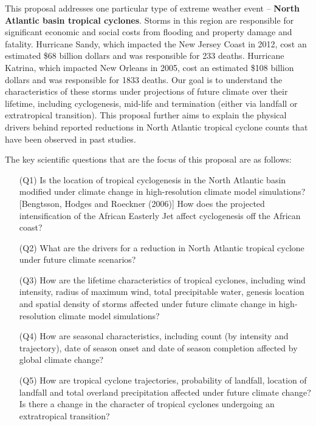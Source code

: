 \documentclass[11pt]{article}
\begin{document}
This proposal addresses one particular type of extreme weather event -- \textbf{North Atlantic basin tropical cyclones}.  Storms in this region are responsible for significant economic and social costs from flooding and property damage and fatality.  Hurricane Sandy, which impacted the New Jersey Coast in 2012, cost an estimated \$68 billion dollars and was responsible for 233 deaths.  Hurricane Katrina, which impacted New Orleans in 2005, cost an estimated \$108 billion dollars and was responsible for 1833 deaths.  Our goal is to understand the characteristics of these storms under projections of future climate over their lifetime, including cyclogenesis, mid-life and termination (either via landfall or extratropical transition).  This proposal  further aims to explain the physical drivers behind reported reductions in North Atlantic tropical cyclone counts that have been observed in past studies.

The key scientific questions that are the focus of this proposal are as follows:
\begin{itemize}
\item[(Q1)] Is the location of tropical cyclogenesis in the North Atlantic basin modified under climate change in high-resolution climate model simulations?  {\color{red}[Bengtsson, Hodges and Roeckner (2006)]}  How does the projected intensification of the African Easterly Jet affect cyclogenesis off the African coast?

\item[(Q2)] What are the drivers for a reduction in North Atlantic tropical cyclone under future climate scenarios?

\item[(Q3)] How are the lifetime characteristics of tropical cyclones, including wind intensity, radius of maximum wind, total precipitable water, genesis location and spatial density of storms affected under future climate change in high-resolution climate model simulations?

\item[(Q4)]  How are seasonal characteristics, including count (by intensity and trajectory), date of season onset and date of season completion affected by global climate change?

\item[(Q5)]  How are tropical cyclone trajectories, probability of landfall, location of landfall and total overland precipitation affected under future climate change?  Is there a change in the character of tropical cyclones undergoing an extratropical transition?
\end{itemize}
\end{document}
